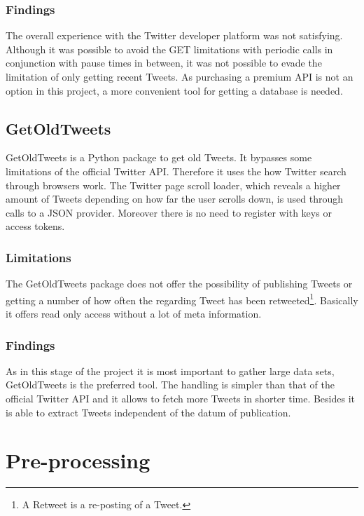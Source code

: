 \documentclass[conference]{IEEEtran}
\begin{document}
\subsubsection{Findings}

The overall experience with the Twitter developer platform was not satisfying. Although it was possible to avoid the GET limitations with periodic calls in conjunction with pause times in between, it was not possible to evade the limitation of only getting recent Tweets. As purchasing a premium API is not an option in this project, a more convenient tool for getting a database is needed.

\subsection{GetOldTweets}\label{subsec_got}

GetOldTweets \cite{got} is a Python package to get old Tweets. It bypasses some limitations of the official Twitter API. Therefore it uses the how Twitter search through browsers work. The Twitter page scroll loader, which reveals a higher amount of Tweets depending on how far the user scrolls down, is used through calls to a JSON provider. Moreover there is no need to register with keys or access tokens.

\subsubsection{Limitations}

The GetOldTweets package does not offer the possibility of publishing Tweets or getting a number of how often the regarding Tweet has been retweeted\footnote{A Retweet is a re-posting of a Tweet.}. Basically it offers read only access without a lot of meta information.

\subsubsection{Findings}

As in this stage of the project it is most important to gather large data sets, GetOldTweets is the preferred tool. The handling is simpler than that of the official Twitter API and it allows to fetch more Tweets in shorter time. Besides it is able to extract Tweets independent of the datum of publication. 

\section{Pre-processing}
\end{document}
